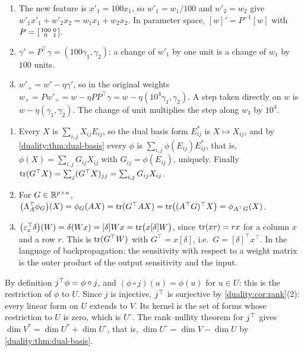 \begin{enumerate}[nosep]
  \item The new feature is $x'_1 = 100x_1$, so
        $w'_1 = w_1/100$ and $w'_2 = w_2$ give
        $w'_1x'_1 + w'_2x_2 = w_1x_1 + w_2x_2$. In parameter space,
        $[w]' = P^{-1}[w]$ with
        $P = \begin{bsmallmatrix}100 & 0\\0 & 1\end{bsmallmatrix}$.
  \item $\gamma' = P^\top\gamma = (100\gamma_1, \gamma_2)$: a change of
        $w'_1$ by one unit is a change of $w_1$ by $100$ units.
  \item $w'_+ = w' - \eta\gamma'$, so in the original weights
        $w_+ = Pw'_+ = w - \eta PP^\top\gamma
        = w - \eta(10^4\gamma_1, \gamma_2)$. A step taken directly on $w$
        is $w - \eta(\gamma_1, \gamma_2)$. The change of unit multiplies
        the step along $w_1$ by $10^4$.
\end{enumerate}

\begin{enumerate}[nosep]
  \item Every $X$ is $\sum_{i,j}X_{ij}E_{ij}$, so the dual basis form
        $E_{ij}^*$ is $X\mapsto X_{ij}$, and by
        \cref{duality:thm:dual-basis} every $\phi$ is
        $\sum_{i,j}\phi(E_{ij})E_{ij}^*$, that is,
        $\phi(X) = \sum_{i,j}G_{ij}X_{ij}$ with $G_{ij} = \phi(E_{ij})$,
        uniquely. Finally
        $\operatorname{tr}(G^\top X) = \sum_j(G^\top X)_{jj} = \sum_{i,j}G_{ij}X_{ij}$.
  \item For $G\in\mathbb{R}^{p\times n}$,
        $\bigl(\Lambda_A^{\top}\phi_G\bigr)(X) = \phi_G(AX)
        = \operatorname{tr}(G^\top AX) = \operatorname{tr}\bigl((A^\top G)^\top X\bigr)
        = \phi_{A^\top G}(X)$.
  \item $\bigl(\varepsilon_x^{\top}\delta\bigr)(W) = \delta(Wx)
        = [\delta]Wx = \operatorname{tr}\bigl(x[\delta]W\bigr)$, since
        $\operatorname{tr}(xr) = rx$ for a column $x$ and a row $r$. This is
        $\operatorname{tr}(G^\top W)$ with $G^\top = x[\delta]$, i.e.\
        $G = [\delta]^\top x^\top$. In the language of backpropagation:
        the sensitivity with respect to a weight matrix is the outer
        product of the output sensitivity and the input.
\end{enumerate}

By definition $j^{\top}\phi = \phi\circ j$, and $(\phi\circ j)(u) = \phi(u)$
for $u\in U$: this is the restriction of $\phi$ to $U$. Since $j$ is
injective, $j^{\top}$ is surjective by \cref{duality:cor:rank}(2): every
linear form on $U$ extends to $V$. Its kernel is the set of forms whose
restriction to $U$ is zero, which is $U^\circ$. The rank--nullity theorem
for $j^{\top}$ gives $\dim V^* = \dim U^* + \dim U^\circ$, that is,
$\dim U^\circ = \dim V - \dim U$ by \cref{duality:thm:dual-basis}.

